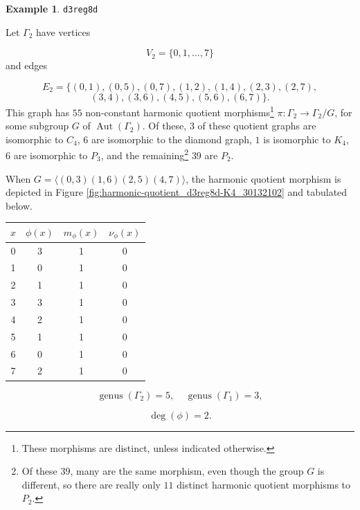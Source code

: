\documentclass[12pt,letterpaper]{article}
\theoremstyle{definition}
\newtheorem{example}[theorem]{Example}
\DeclareMathOperator{\Aut}{Aut}
\DeclareMathOperator{\genus}{genus}
\begin{document}
\begin{example}%
\label{example:d3reg8d}
    {\tt d3reg8d}\newline
{\rm  
Let $\Gamma_2$ have vertices

\[
V_2=\{0,1,\dots,7\}
\]
and edges

\[
E_2 = \{(0, 1), (0, 5), (0, 7), (1, 2), (1, 4), (2, 3), (2, 7),
\]
\[
(3, 4), (3, 6), (4, 5), (5, 6), (6, 7)
\}.
\]
This graph has $55$ non-constant harmonic quotient
morphisms\footnote{These morphisms are distinct, unless indicated otherwise.}
$\pi: \Gamma_2\to \Gamma_2/G$, for some subgroup
$G$ of $\Aut(\Gamma_2)$. Of these, $3$ of these quotient graphs
are isomorphic to $C_4$, $6$ are isomorphic to the diamond graph,
$1$ is isomorphic to $K_4$,
$6$ are isomorphic to $P_3$, and the
remaining\footnote{Of these $39$, many are the same
morphism, even though the group $G$ is different, so there are
really only $11$ distinct harmonic quotient morphisms to $P_2$.}
$39$ are $P_2$. 

When $G=\langle (0,3)(1,6)(2,5)(4,7) \rangle$, 
the harmonic quotient morphism is depicted in
Figure \ref{fig:harmonic-quotient_d3reg8d-K4_30132102}
and tabulated below.

\begin{center}
\begin{tabular}{c|c|c|c}  
  $x$ & $\phi(x)$ & $m_\phi(x)$ & $\nu_\phi(x)$ \\ \hline
  0   &    3   &        1         &  0   \\ 
  1   &    0   &        1         &  0   \\ 
  2   &    1    &       1         &  0   \\ 
  3   &    3   &        1         &  0   \\ 
  4   &    2   &        1         &  0   \\ 
  5   &    1   &        1         &  0    \\ 
  6   &    0   &        1         &  0   \\ 
  7   &    2   &        1         &  0   \\ 
\end{tabular}
\end{center}

\[
  \genus(\Gamma_2) =5,\ \ \ \ \
  \genus(\Gamma_1) =3,
\]

\[
\deg(\phi) =2.
\]

}
\end{example}
\end{document}
